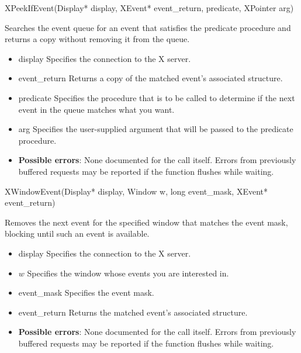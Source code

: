 \documentclass{report}
\begin{document}
\begin{itemize}
        \begin{cppcode}
            XPeekIfEvent(Display* display, XEvent* event_return, predicate, XPointer arg)
        \end{cppcode}
        \bigbreak \noindent
        Searches the event queue for an event that satisfies the predicate procedure and returns a copy without removing it from the queue.

        \begin{itemize}
            \item display Specifies the connection to the X server.
            \item event\_return Returns a copy of the matched event’s associated structure.
            \item predicate Specifies the procedure that is to be called to determine if the next event in the queue matches what you want.
            \item arg Specifies the user-supplied argument that will be passed to the predicate procedure.
        \end{itemize}

        \begin{itemize}
            \item \textbf{Possible errors}: None documented for the call itself. Errors from previously buffered requests may be reported if the function flushes while waiting.
        \end{itemize}

        \begin{cppcode}
            XWindowEvent(Display* display, Window w, long event_mask, XEvent* event_return)
        \end{cppcode}
        \bigbreak \noindent
        Removes the next event for the specified window that matches the event mask, blocking until such an event is available.

        \begin{itemize}
            \item display Specifies the connection to the X server.
            \item $w$ Specifies the window whose events you are interested in.
            \item event\_mask Specifies the event mask.
            \item event\_return Returns the matched event’s associated structure.
        \end{itemize}

        \begin{itemize}
            \item \textbf{Possible errors}: None documented for the call itself. Errors from previously buffered requests may be reported if the function flushes while waiting.
        \end{itemize}


\end{itemize}
\end{document}
